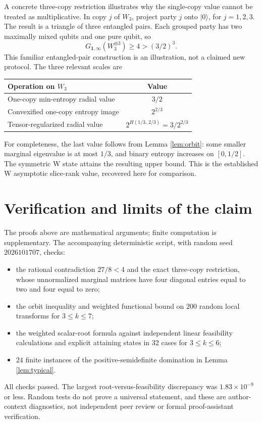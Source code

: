 \documentclass[11pt,a4paper]{article}
\newcommand{\one}{\mathbf 1}
\newcommand{\ket}[1]{|#1\rangle}
\begin{document}
A concrete three-copy restriction illustrates why the single-copy
value cannot be treated as multiplicative. In copy \(j\) of \(W_3\),
project party \(j\) onto \(\ket0\), for \(j=1,2,3\).
The result is a triangle of three entangled pairs. Each grouped
party has two maximally mixed qubits and one pure qubit, so
\[
 G_{\one,\infty}(W_3^{\otimes3})\ge4>(3/2)^3.
\]
This familiar entangled-pair construction is an illustration,
not a claimed new protocol. The three relevant scales are
\begin{center}
\begin{tabular}{lc}
\toprule
Operation on \(W_3\) & Value\\
\midrule
One-copy min-entropy radial value & \(3/2\)\\
Convexified one-copy entropy image & \(2^{2/3}\)\\
Tensor-regularized radial value & \(2^{H(1/3,\,2/3)}=3/2^{2/3}\)\\
\bottomrule
\end{tabular}
\end{center}
For completeness, the last value follows from Lemma \ref{lem:orbit}:
some smaller marginal eigenvalue is at most \(1/3\), and binary
entropy increases on \([0,1/2]\). The symmetric W state attains
the resulting upper bound. This is the established W asymptotic
slice-rank value, recovered here for comparison.

\section{Verification and limits of the claim}
The proofs above are mathematical arguments; finite computation
is supplementary. The accompanying deterministic script,
with random seed \(2026101707\), checks:
\begin{itemize}
 \item the rational contradiction \(27/8<4\) and the exact three-copy
 restriction, whose unnormalized marginal matrices have four
 diagonal entries equal to two and four equal to zero;
 \item the orbit inequality and weighted functional bound on
 \(200\) random local transforms for \(3\le k\le7\);
 \item the weighted scalar-root formula against independent linear
 feasibility calculations and explicit attaining states in \(32\)
 cases for \(3\le k\le6\);
 \item \(24\) finite instances of the positive-semidefinite domination
 in Lemma \ref{lem:typical}.
\end{itemize}
All checks passed. The largest root-versus-feasibility discrepancy
was \(1.83\times10^{-9}\) or less. Random tests do not prove a universal
statement, and these are author-context diagnostics, not independent
peer review or formal proof-assistant verification.
\end{document}
